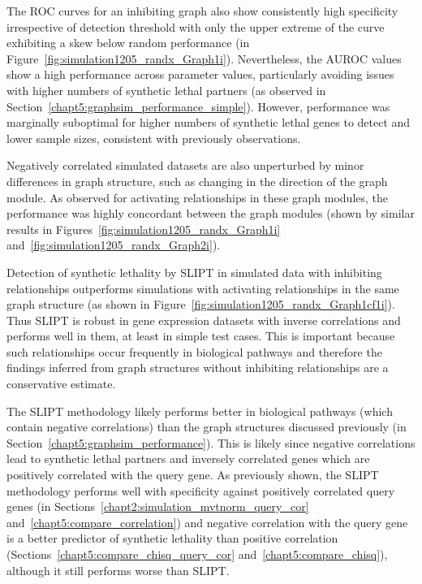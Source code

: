The \gls{ROC} curves for an inhibiting graph also show consistently high specificity irrespective of detection threshold with only the upper extreme of the curve exhibiting a skew below random performance (in Figure~\ref{fig:simulation1205_randx_Graph1i}). Nevertheless, the \gls{AUROC} values show a high performance across parameter values, particularly avoiding issues with higher numbers of synthetic lethal partners (as observed in Section~\ref{chapt5:graphsim_performance_simple}). However,  performance was marginally suboptimal for higher numbers of synthetic lethal genes to detect and lower sample sizes, consistent with previously observations.

Negatively correlated simulated datasets are also unperturbed by minor differences in graph structure, such as changing in the direction of the graph module. As observed for activating relationships in these graph modules, the performance was highly concordant between the graph modules (shown by similar results in Figures~\ref{fig:simulation1205_randx_Graph1i} and~\ref{fig:simulation1205_randx_Graph2i}).

Detection of synthetic lethality by \gls{SLIPT} in simulated data with inhibiting relationships outperforms simulations with activating relationships in the same graph structure (as shown in Figure~\ref{fig:simulation1205_randx_Graph1cf1i}). Thus \gls{SLIPT} is robust in gene expression datasets with inverse correlations and performs well in them, at least in simple test cases. This is important because such relationships occur frequently in biological pathways and therefore the findings inferred from graph structures without inhibiting relationships are a conservative estimate.

The \gls{SLIPT} methodology likely performs better in biological pathways (which contain negative correlations) than the graph structures discussed previously (in Section~\ref{chapt5:graphsim_performance}). This is likely since negative correlations lead to synthetic lethal partners and inversely correlated genes which are positively correlated with the query gene. As previously shown, the \gls{SLIPT} methodology performs well with specificity against positively correlated query genes (in Sections~\ref{chapt2:simulation_mvtnorm_query_cor} and~\ref{chapt5:compare_correlation}) and negative correlation with the query gene is a better predictor of synthetic lethality than positive correlation (Sections~\ref{chapt5:compare_chisq_query_cor} and~\ref{chapt5:compare_chisq}), although it still performs worse than \gls{SLIPT}.

